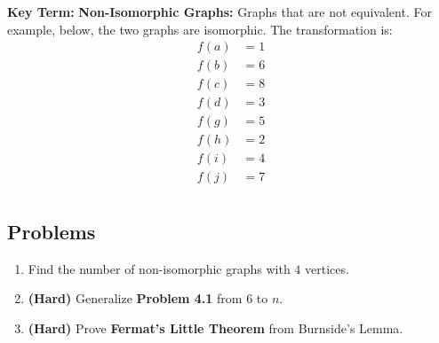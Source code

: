 \documentclass[11pt]{scrartcl}
\begin{document}
\begin{tcolorbox}[colback=vocabcolor!5!white,colframe=vocabcolor!75!black]
  \color{vocabcolor} \textbf{Key Term:} \color{black}
      \textbf{Non-Isomorphic Graphs:} Graphs that are not equivalent. For example, below, the two graphs are isomorphic. The transformation is: 
\begin{align*}
f(a) &= 1 \\
f(b) &= 6 \\
f(c) &= 8 \\
f(d) &= 3 \\
f(g) &= 5 \\
f(h) &= 2 \\
f(i) &= 4 \\
f(j) &= 7 \\
\end{align*}
\end{tcolorbox}

\begin{figure}[h!]
    \centering
\end{figure}

\newpage

\subsection{Problems}
\begin{enumerate}
    \item Find the number of non-isomorphic graphs with $4$ vertices.
    \item \textbf{(Hard)} Generalize \color{red} \textbf{Problem 4.1} \color{black} from $6$ to $n$.
    \item \textbf{(Hard)} Prove \color{blue} \textbf{Fermat's Little Theorem} \color{black} from Burnside's Lemma.
\end{enumerate}
\end{document}
